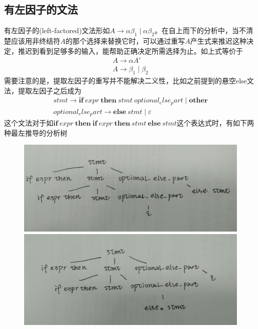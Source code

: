 \documentclass[]{report}
\begin{document}
		\subsection{有左因子的文法}
		有左因子的(left-factored)文法形如$A\to\alpha\beta_1\mid\alpha\beta_2$。在自上而下的分析中，当不清楚应该用非终结符$A$的那个选择来替换它时，可以通过重写$A$产生式来推迟这种决定，推迟到看到足够多的输入，能帮助正确决定所需选择为止。如上式等价于\[\begin{gathered}
			A\to\alpha A'\\
			A\to\beta_1\mid\beta_2
		\end{gathered}\]
		需要注意的是，提取左因子的重写并不能解决二义性，比如之前提到的悬空else文法，提取左因子之后成为
		\[\begin{gathered}
			stmt\to\mathbf{if}\ expr\ \mathbf{then}\ stmt\ optional_else_part\mid\mathbf{other}\\
			optional_else_part\to\mathbf{else}\ stmt\mid\varepsilon
		\end{gathered}\]
		这个文法对于如$\mathbf{if}\ expr\ \mathbf{then}\ \mathbf{if}\ expr\ \mathbf{then}\ stmt\ \mathbf{else}\ stmt$这个表达式时，有如下两种最左推导的分析树
		\begin{figure}[h!]
			\centering
			\begin{minipage}{20em}
				\centering
				\includegraphics[scale = 0.05]{images/Left_Ambiguity_1.JPG}
			\end{minipage}
			\begin{minipage}{20em}
				\centering
				\includegraphics[scale = 0.048]{images/Left_Ambiguity_2.JPG}
			\end{minipage}
		\end{figure}
\end{document}

